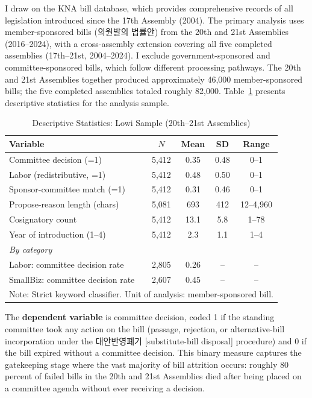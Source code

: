 \documentclass[11pt]{article}
\begin{document}
I draw on the KNA bill database, which provides comprehensive records of all legislation introduced since the 17th Assembly (2004). The primary analysis uses member-sponsored bills (의원발의 법률안) from the 20th and 21st Assemblies (2016--2024), with a cross-assembly extension covering all five completed assemblies (17th--21st, 2004--2024). I exclude government-sponsored and committee-sponsored bills, which follow different processing pathways. The 20th and 21st Assemblies together produced approximately 46,000 member-sponsored bills; the five completed assemblies totaled roughly 82,000. Table~\ref{tab:desc} presents descriptive statistics for the analysis sample.

\begin{table}[H]
\centering
\caption{Descriptive Statistics: Lowi Sample (20th--21st Assemblies)}
\label{tab:desc}
\begin{tabular}{lcccc}
\toprule
Variable & $N$ & Mean & SD & Range \\
\midrule
Committee decision (=1) & 5,412 & 0.35 & 0.48 & 0--1 \\
Labor (redistributive, =1) & 5,412 & 0.48 & 0.50 & 0--1 \\
Sponsor-committee match (=1) & 5,412 & 0.31 & 0.46 & 0--1 \\
Propose-reason length (chars) & 5,081 & 693 & 412 & 12--4,960 \\
Cosignatory count & 5,412 & 13.1 & 5.8 & 1--78 \\
Year of introduction (1--4) & 5,412 & 2.3 & 1.1 & 1--4 \\
\midrule
\multicolumn{5}{l}{\textit{By category}} \\
\quad Labor: committee decision rate & 2,805 & 0.26 & -- & -- \\
\quad SmallBiz: committee decision rate & 2,607 & 0.45 & -- & -- \\
\bottomrule
\multicolumn{5}{l}{\footnotesize Note: Strict keyword classifier. Unit of analysis: member-sponsored bill.} \\
\end{tabular}
\end{table}

The \textbf{dependent variable} is committee decision, coded 1 if the standing committee took any action on the bill (passage, rejection, or alternative-bill incorporation under the 대안반영폐기 [substitute-bill disposal] procedure) and 0 if the bill expired without a committee decision. This binary measure captures the gatekeeping stage where the vast majority of bill attrition occurs: roughly 80 percent of failed bills in the 20th and 21st Assemblies died after being placed on a committee agenda without ever receiving a decision.
\end{document}
